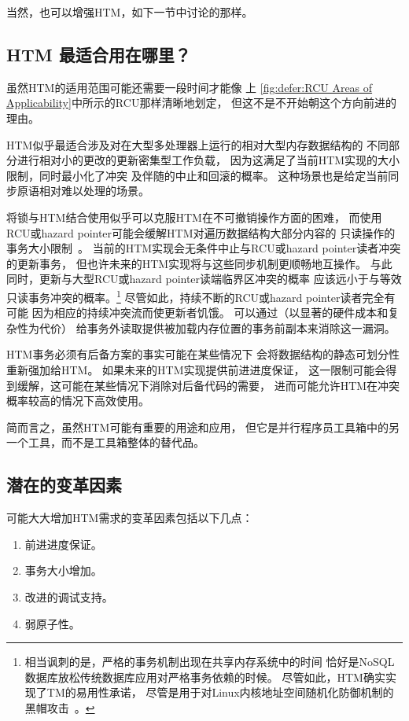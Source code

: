 当然，也可以增强HTM，如下一节中讨论的那样。

\subsection{HTM 最适合用在哪里？}
\label{sec:future:Where Does HTM Best Fit In?}

虽然HTM的适用范围可能还需要一段时间才能像
上
\cref{fig:defer:RCU Areas of Applicability}中所示的RCU那样清晰地划定，
但这不是不开始朝这个方向前进的理由。

HTM似乎最适合涉及对在大型多处理器上运行的相对大型内存数据结构的
不同部分进行相对小的更改的更新密集型工作负载，
因为这满足了当前HTM实现的大小限制，同时最小化了冲突
及伴随的中止和回滚的概率。
这种场景也是给定当前同步原语相对难以处理的场景。

将锁与HTM结合使用似乎可以克服HTM在不可撤销操作方面的困难，
而使用RCU或hazard pointer可能会缓解HTM对遍历数据结构大部分内容的
只读操作的事务大小限制~\cite{SeongJaePark2020HTMRCUlock}。
当前的HTM实现会无条件中止与RCU或hazard pointer读者冲突的更新事务，
但也许未来的HTM实现将与这些同步机制更顺畅地互操作。
与此同时，更新与大型RCU或hazard pointer读端临界区冲突的概率
应该远小于与等效只读事务冲突的概率。\footnote{
	相当讽刺的是，严格的事务机制出现在共享内存系统中的时间
	恰好是NoSQL数据库放松传统数据库应用对严格事务依赖的时候。
	尽管如此，HTM确实实现了TM的易用性承诺，
	尽管是用于对Linux内核地址空间随机化防御机制的
	黑帽攻击~\cite{YeongjinJang2016TSXbreakKASLR,Jang:2016:BKA:2976749.2978321}。}
尽管如此，持续不断的RCU或hazard pointer读者完全有可能
因为相应的持续冲突流而使更新者饥饿。
可以通过（以显著的硬件成本和复杂性为代价）
给事务外读取提供被加载内存位置的事务前副本来消除这一漏洞。

HTM事务必须有后备方案的事实可能在某些情况下
会将数据结构的静态可划分性重新强加给HTM。
如果未来的HTM实现提供前进进度保证，
这一限制可能会得到缓解，这可能在某些情况下消除对后备代码的需要，
进而可能允许HTM在冲突概率较高的情况下高效使用。

简而言之，虽然HTM可能有重要的用途和应用，
但它是并行程序员工具箱中的另一个工具，而不是工具箱整体的替代品。

\subsection{潜在的变革因素}
\label{sec:future:Potential Game Changers}

可能大大增加HTM需求的变革因素包括以下几点：

\begin{enumerate}
\item	前进进度保证。
\item	事务大小增加。
\item	改进的调试支持。
\item	弱原子性。
\end{enumerate}

